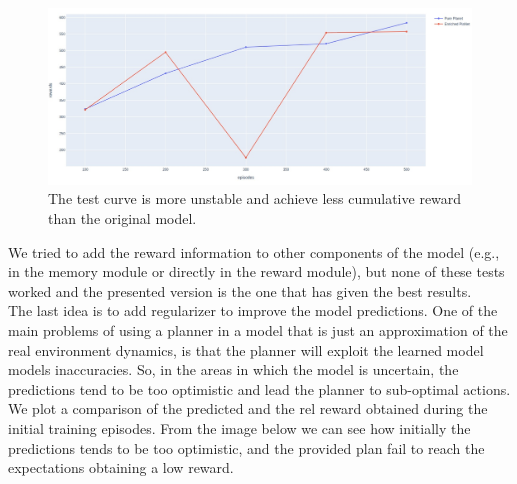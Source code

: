 \begin{figure}[H]
\centering
\includegraphics[width=1. \textwidth, height=.35\textheight]{pictures/rew_as_state_vs_pure_planet}
\caption{ The test curve is more unstable and achieve less cumulative reward than the original model. }
\end{figure}
We tried to add the reward information to other components of the model (e.g., in the memory module or directly in the reward module), but none of these tests worked and the presented version is the one that has given the best results. 
\\
The last idea is to add regularizer to improve the model predictions.
One of the main problems of using a planner in a model that is just an approximation of the real environment dynamics, is that the planner will exploit the learned model models inaccuracies. So, in the areas in which the model is uncertain, the predictions tend to be too optimistic and lead the planner to sub-optimal actions. 
We plot a comparison of the predicted and the rel reward obtained during the initial training episodes. From the image below we can see how initially the predictions tends to be too optimistic, and the provided plan fail to reach the expectations obtaining a low reward.

